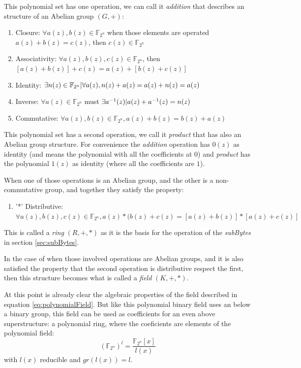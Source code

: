 \documentclass[10pt,a4paper,twoside]{llncs}
\newcommand{\Fpn}[2]{\ensuremath{\mathbb{F}_{#1^#2}}}
\begin{document}
This polynomial set has one operation, we can call it \emph{addition} that describes an structure of an Abelian group $(G,+)$:
\begin{enumerate}
 \item Closure: $\forall a(z),b(z) \in \Fpn{2}{n}$ when those elements are operated $a(z)+b(z)=c(z)$, then $c(z) \in \Fpn{2}{n}$
 \item Associativity: $\forall a(z),b(z),c(z) \in \Fpn{2}{n}$, then $[a(z)+b(z)]+c(z)=a(z)+[b(z)+c(z)]$
 \item Identity: $\exists n(z) \in \Fpn{2}{n} \arrowvert \forall a(z), n(z)+a(z)=a(z)+n(z)=a(z)$
 \item Inverse: $\forall a(z) \in \Fpn{2}{n}$ must $\exists a^{-1}(z) \arrowvert a(z)+a^{-1}(z) = n(z)$
 \item Commutative: $\forall a(z),b(z) \in \Fpn{2}{n}, a(z)+b(z)=b(z)+a(z)$
\end{enumerate}

This polynomial set has a second operation, we call it \emph{product} that has also an Abelian group structure. For convenience the \emph{addition} operation has $0(z)$ as identity (and means the polynomial with all the coefficients at $0$) and \emph{product} has the polynomial $1(z)$ as identity (where all the coefficients are $1$).

When one of those operations is an Abelian group, and the other is a non-commutative group, and together they satisfy the property:
\begin{enumerate}
 \item '*' Distributive: $\forall a(z),b(z),c(z) \in \Fpn{2}{n}, a(z)*(b(z)+c(z)=[a(z)+b(z)]*[a(z)+c(z)]$
\end{enumerate}
This is called a \emph{ring} $(R,+,*)$ as it is the basis for the operation of the \emph{subBytes} in section \ref{sec:subBytes}.

In the case of when those involved operations are Abelian groups, and it is also satisfied the property that the second operation is distributive respect the first, then this structure becomes what is called a \emph{field} $(K,+,*)$.

At this point is already clear the algebraic properties of the field described in equation \ref{eq:polynomialField}. But like this polynomial binary field uses an below a binary group, this field can be used as coefficients for an even above superstructure: a polynomial ring, where the coeficients are elements of the polynomial field:
\begin{equation}\label{eq:polynomialRing}
    (\Fpn{2}{n})^l=\frac{\Fpn{2}{n}[x]}{l(x)}
\end{equation}
with $l(x)$ reducible and $gr(l(x))=l$.
\end{document}
